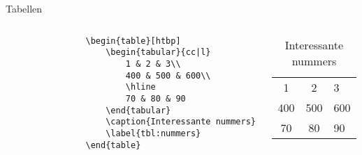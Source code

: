 \copyrightVincent

\begin{frame}[fragile]{Tabellen}
    \begin{columns}
        \begin{column}{0.5\textwidth}
            \begin{verbatim}
                \begin{table}[htbp]
                    \begin{tabular}{cc|l}
                        1 & 2 & 3\\
                        400 & 500 & 600\\
                        \hline
                        70 & 80 & 90
                    \end{tabular}
                    \caption{Interessante nummers}
                    \label{tbl:nummers}
                \end{table}
            \end{verbatim}
        \end{column}
        \begin{column}{0.5\textwidth}
            \begin{table}[h]
                \begin{tabular}{cc|l}
                    1 & 2 & 3\\
                    400 & 500 & 600\\
                    \hline
                    70 & 80 & 90
                \end{tabular}
                \caption{Interessante nummers}
                \label{tbl:nummers}
            \end{table}
        \end{column}
    \end{columns}
\end{frame}


